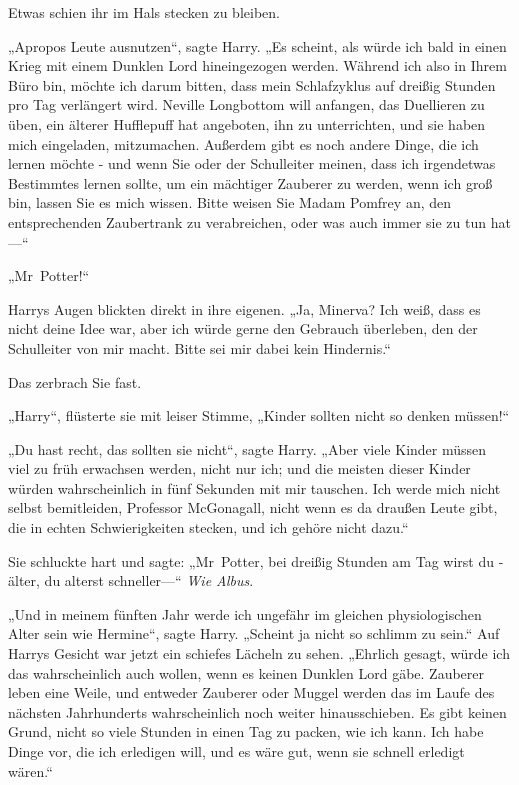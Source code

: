 {Etwas schien ihr im Hals stecken zu bleiben.

„Apropos Leute ausnutzen“, sagte Harry. „Es scheint, als würde ich bald in einen Krieg mit einem Dunklen Lord hineingezogen werden. Während ich also in Ihrem Büro bin, möchte ich darum bitten, dass mein Schlafzyklus auf dreißig Stunden pro Tag verlängert wird. Neville Longbottom will anfangen, das Duellieren zu üben, ein älterer Hufflepuff hat angeboten, ihn zu unterrichten, und sie haben mich eingeladen, mitzumachen. Außerdem gibt es noch andere Dinge, die ich lernen möchte - und wenn Sie oder der Schulleiter meinen, dass ich irgendetwas Bestimmtes lernen sollte, um ein mächtiger Zauberer zu werden, wenn ich groß bin, lassen Sie es mich wissen. Bitte weisen Sie Madam Pomfrey an, den entsprechenden Zaubertrank zu verabreichen, oder was auch immer sie zu tun hat—“

„Mr~Potter!“

Harrys Augen blickten direkt in ihre eigenen. „Ja, Minerva? Ich weiß, dass es nicht deine Idee war, aber ich würde gerne den Gebrauch überleben, den der Schulleiter von mir macht. Bitte sei mir dabei kein Hindernis.“

Das zerbrach Sie fast.

„Harry“, flüsterte sie mit leiser Stimme, „Kinder sollten nicht so denken müssen!“

„Du hast recht, das sollten sie nicht“, sagte Harry. „Aber viele Kinder müssen viel zu früh erwachsen werden, nicht nur ich; und die meisten dieser Kinder würden wahrscheinlich in fünf Sekunden mit mir tauschen. Ich werde mich nicht selbst bemitleiden, Professor McGonagall, nicht wenn es da draußen Leute gibt, die in echten Schwierigkeiten stecken, und ich gehöre nicht dazu.“

Sie schluckte hart und sagte: „Mr~Potter, bei dreißig Stunden am Tag wirst du - älter, du alterst schneller—“ \emph{Wie Albus}.

„Und in meinem fünften Jahr werde ich ungefähr im gleichen physiologischen Alter sein wie Hermine“, sagte Harry. „Scheint ja nicht so schlimm zu sein.“ Auf Harrys Gesicht war jetzt ein schiefes Lächeln zu sehen. „Ehrlich gesagt, würde ich das wahrscheinlich auch wollen, wenn es keinen Dunklen Lord gäbe. Zauberer leben eine Weile, und entweder Zauberer oder Muggel werden das im Laufe des nächsten Jahrhunderts wahrscheinlich noch weiter hinausschieben. Es gibt keinen Grund, nicht so viele Stunden in einen Tag zu packen, wie ich kann. Ich habe Dinge vor, die ich erledigen will, und es wäre gut, wenn sie schnell erledigt wären.“

}
